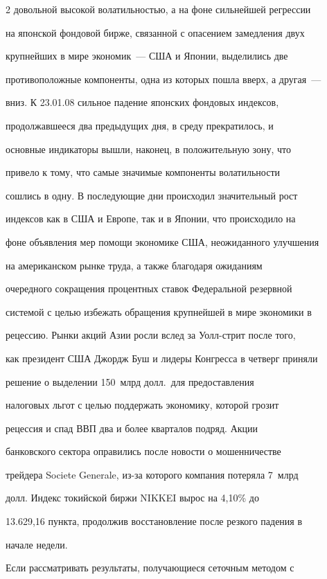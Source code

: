 \begin{multicols}{2}
довольной высокой волатильностью, а на фоне сильнейшей регрессии


на японской фондовой бирже, связанной с опасением замедления двух


крупнейших в мире экономик~--- США и Японии, выделились две


противоположные компоненты, одна из которых пошла вверх, а другая~---


вниз. К 23.01.08 сильное падение японских фондовых индексов,


продолжавшееся два предыду\-щих дня, в среду прекратилось, и


основные индикаторы вышли, наконец, в положительную зону, что


привело к тому, что самые значимые компоненты волатильности


сошлись в одну. В последующие дни происходил значительный рост


индексов как в США и Европе, так и в Японии, что происходило на


фоне объявления мер помощи экономике США, неожиданного улучшения


на американском рынке труда, а также благодаря ожиданиям


очередного сокращения процентных ставок Федеральной резервной


системой с целью избежать обращения крупнейшей в мире экономики в


рецессию. Рынки акций Азии росли вслед за Уолл-стрит после того,


как президент США Джордж Буш и лидеры Конгресса в четверг приняли


решение о выделении 150~млрд долл.\ для предоставления


налоговых льгот с целью поддержать экономику, которой грозит


рецессия и спад ВВП два и более кварталов подряд. Акции


банковского сектора оправились после новости о мошенничестве


трейдера Societe Generale, из-за которого компания потеряла 7~млрд


долл. Индекс токийской биржи NIKKEI вырос на 4,10\% до


13.629,16 пункта, продолжив вос\-ста\-нов\-ле\-ние после резкого падения в


начале недели.





Если рассматривать результаты, получающиеся сеточным методом с



\end{multicols}
